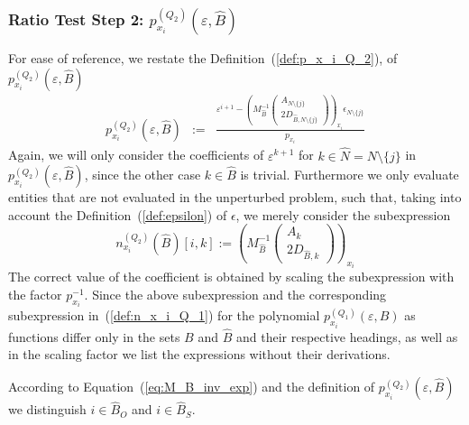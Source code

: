 \documentclass[a4paper]{article}
\newcommand{\px}[3]{\ensuremath{p_{x_{#1}}^{(#2)}(\varepsilon, #3)}}
\begin{document}
\subsubsection{Ratio Test Step 2: \px{i}{Q_{2}}{\hat{B}}}
For ease of reference, we restate the Definition~(\ref{def:p_x_i_Q_2}),
of $\px{i}{Q_{2}}{\hat{B}}$
\begin{eqnarray*}
\px{i}{Q_{2}}{\hat{B}} &:=&
  \frac{\varepsilon^{i+1} -
         \left(M_{\hat{B}}^{-1}
           \left(\begin{array}{c}
                    A_{N \setminus \{j\}}  \\
	            \hline
	            2D_{\hat{B}, N \setminus \{j\}}
	         \end{array}
	   \right)
         \right)_{x_{i}}\epsilon_{N \setminus \{j\}}}{p_{x_{i}}}
\end{eqnarray*}
Again, we will only consider the coefficients of
$\varepsilon^{k+1}$ for $k \in \hat{N}= N \setminus \{j\}$ in
\px{i}{Q_{2}}{\hat{B}}, since the other case $k \in \hat{B}$
is trivial. Furthermore we only evaluate entities that are not evaluated in the
unperturbed problem, such that, taking into account the
Definition~(\ref{def:epsilon}) of $\epsilon$, 
we merely consider the subexpression
\begin{equation}
\label{def:n_x_i_Q_2}
n_{x_{i}}^{(Q_{2})}(\hat{B})[i,k]:=
\left(
  M_{\hat{B}}^{-1}
  \left(\begin{array}{c}
          A_{k}  \\
          \hline
          2D_{\hat{B}, k}
        \end{array}
  \right)
\right)_{x_{i}}
\end{equation}
The correct value of the coefficient is obtained by scaling the subexpression
with the factor $p_{x_{i}}^{-1}$.
Since the above subexpression and the corresponding subexpression
in~(\ref{def:n_x_i_Q_1}) for the polynomial \px{i}{Q_{1}}{B} as
functions differ only in the sets $B$ and $\hat{B}$ and their respective
headings, as well as in the scaling factor
we list the expressions without their derivations.

According to Equation~(\ref{eq:M_B_inv_exp}) and the definition of
\px{i}{Q_{2}}{\hat{B}} we distinguish $i \in \hat{B}_{O}$ and
$i \in \hat{B}_{S}$.
  
\end{document}
